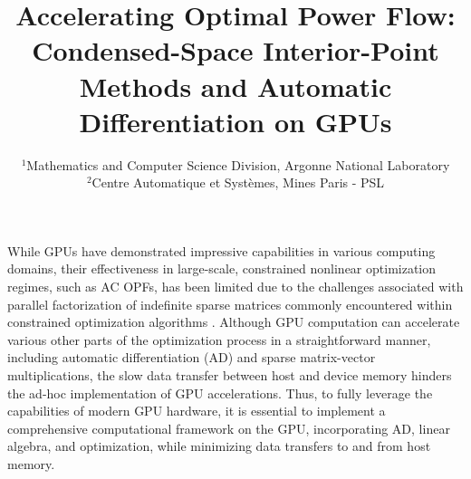 
\title{Accelerating Optimal Power Flow: Condensed-Space Interior-Point Methods and Automatic Differentiation on GPUs}

\author{
}
\date{\small
  $^{1}$Mathematics and Computer Science Division, Argonne National Laboratory\\
  $^{2}$Centre Automatique et Syst\`{e}mes, Mines Paris - PSL
}

\maketitle

While GPUs have demonstrated impressive capabilities in various computing domains, their effectiveness in large-scale, constrained nonlinear optimization regimes, such as AC OPFs, has been limited due to the challenges associated with parallel factorization of indefinite sparse matrices commonly encountered within constrained optimization algorithms \cite{anitescu2021targeting}. Although GPU computation can accelerate various other parts of the optimization process in a straightforward manner, including automatic differentiation (AD) and sparse matrix-vector multiplications, the slow data transfer between host and device memory hinders the ad-hoc implementation of GPU accelerations. Thus, to fully leverage the capabilities of modern GPU hardware, it is essential to implement a comprehensive computational framework on the GPU, incorporating AD, linear algebra, and optimization, while minimizing data transfers to and from host memory.

